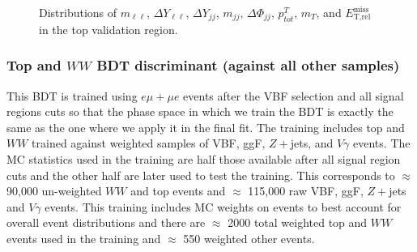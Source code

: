 \begin{figure}[!h]
{  }\hfill
  \hfill
{\caption{Distributions of $m_{\ell\ell}$, $\Delta Y_{\ell\ell}$, $\Delta Y_{jj}$, $m_{jj}$, $\Delta\Phi_{jj}$, $p^T_{tot}$, $m_T$, and $\ensuremath{E_{\text{T,rel}}^{\text{miss}}}$ in the top validation region.
\label{fig:TopCR3}}}
\end{figure}

\subsubsection{Top and $WW$ BDT discriminant (against all other samples)}

This BDT is trained using $e\mu+\mu e$ events after the VBF selection and all signal regions cuts so that the phase space in which we train the BDT is exactly the same as the one where we apply it in the final fit. The training includes top and $WW$ trained against weighted samples of VBF, ggF, $Z+$jets, and $V\gamma$ events. The MC statistics used in the training are half those available after all signal region cuts and the other half are later used to test the training. This corresponds to $\approx$ 90,000 un-weighted $WW$ and top events and $\approx$ 115,000 raw VBF, ggF, $Z+$jets and $V\gamma$ events. This training includes MC weights on events to best account for overall event distributions and there are $\approx$ 2000 total weighted top and $WW$ events used in the training and $\approx$ 550 weighted other events. 

